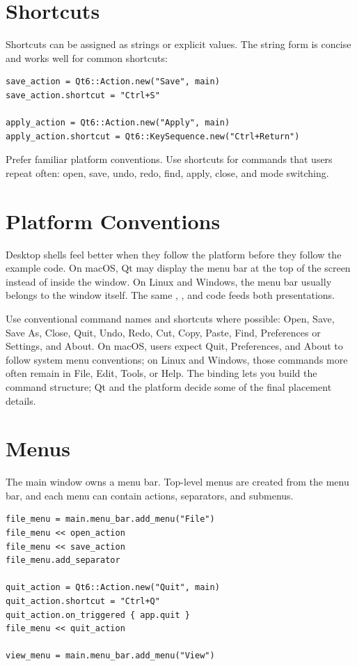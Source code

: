 \section{Shortcuts}

Shortcuts can be assigned as strings or explicit  values. The string form is concise and works well for common shortcuts:

\begin{lstlisting}[style=crystal]
save_action = Qt6::Action.new("Save", main)
save_action.shortcut = "Ctrl+S"

apply_action = Qt6::Action.new("Apply", main)
apply_action.shortcut = Qt6::KeySequence.new("Ctrl+Return")
\end{lstlisting}

Prefer familiar platform conventions. Use shortcuts for commands that users repeat often: open, save, undo, redo, find, apply, close, and mode switching.

\section{Platform Conventions}

Desktop shells feel better when they follow the platform before they follow the example code. On macOS, Qt may display the menu bar at the top of the screen instead of inside the window. On Linux and Windows, the menu bar usually belongs to the window itself. The same , , and  code feeds both presentations.

Use conventional command names and shortcuts where possible: Open, Save, Save As, Close, Quit, Undo, Redo, Cut, Copy, Paste, Find, Preferences or Settings, and About. On macOS, users expect Quit, Preferences, and About to follow system menu conventions; on Linux and Windows, those commands more often remain in File, Edit, Tools, or Help. The binding lets you build the command structure; Qt and the platform decide some of the final placement details.

\section{Menus}

The main window owns a menu bar. Top-level menus are created from the menu bar, and each menu can contain actions, separators, and submenus.

\begin{lstlisting}[style=crystal]
file_menu = main.menu_bar.add_menu("File")
file_menu << open_action
file_menu << save_action
file_menu.add_separator

quit_action = Qt6::Action.new("Quit", main)
quit_action.shortcut = "Ctrl+Q"
quit_action.on_triggered { app.quit }
file_menu << quit_action

view_menu = main.menu_bar.add_menu("View")
\end{lstlisting}

